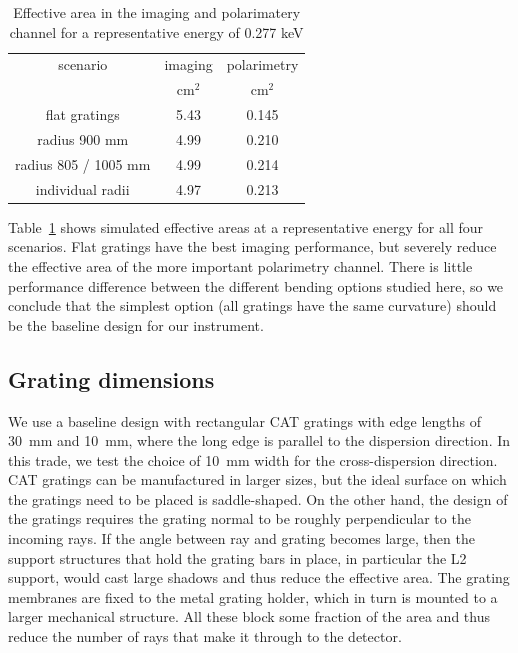 \documentclass[]{spie}  %
\begin{document}
\begin{table}
  \caption{Effective area in the imaging and polarimatery channel for a representative energy of 0.277 keV}
  \label{tab:curvature}
\begin{center}
\begin{tabular}{c|c|c}
scenario & imaging & polarimetry \\
& $\mathrm{cm^{2}}$ & $\mathrm{cm^{2}}$ \\
\hline\hline
flat gratings & 5.43 & 0.145 \\
radius 900 mm & 4.99 & 0.210 \\
radius   805 /  1005 mm & 4.99 & 0.214 \\
individual radii & 4.97 & 0.213 \\
\end{tabular}
\end{center}
\end{table}
Table~\ref{tab:curvature} shows simulated effective areas at a
representative energy for all four scenarios.  Flat gratings have the
best imaging performance, but severely reduce the effective area of
the more important polarimetry channel. There is little performance
difference between the different bending options studied here, so we
conclude that the simplest option (all gratings have the same
curvature) should be the baseline design for our instrument.

\subsection{Grating dimensions}
We use a baseline design with rectangular CAT gratings with edge
lengths of 30~mm and 10~mm, where the long edge is parallel to the
dispersion direction. In this trade, we test the choice of 10~mm width
for the cross-dispersion direction. CAT gratings can be manufactured
in larger sizes, but the ideal surface on which the gratings need to
be placed is saddle-shaped. On the other hand, the design of the
gratings requires the grating normal to be roughly perpendicular to
the incoming rays. If the angle between ray and grating becomes large,
then the support structures that hold the grating bars in place, in
particular the L2 support,
would cast large shadows and thus reduce the effective area. The
grating membranes are fixed to the metal grating holder, which in turn
is mounted to a larger mechanical structure. All these block some
fraction of the area and thus reduce the number of rays that make it
through to the detector.
\end{document}
